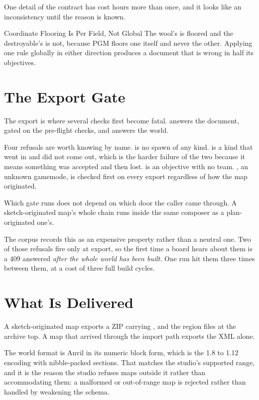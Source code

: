 One detail of the contract has cost hours more than once, and it looks like an
inconsistency until the reason is known.

\begin{ruling}{Coordinate Flooring Is Per Field, Not Global}
The wool's  is floored and the destroyable's  is not,
because PGM floors one itself and never the other. Applying one rule globally in
either direction produces a document that is wrong in half its objectives.
\end{ruling}

\section{The Export Gate}

The export is where several checks first become fatal.  answers the document, gated on the pre-flight checks, and
 answers the world.

Four refusals are worth knowing by name.  is no spawn of any kind.
 is a kind that went in and did not come out, which is the harder failure
of the two because it means something was accepted and then lost.  is an
objective with no team. , an unknown gamemode, is checked first on every
export regardless of how the map originated.

Which gate runs does not depend on which door the caller came through. A
sketch-originated map's whole chain runs inside the same composer as a
plan-originated one's.

The corpus records this as an expensive property rather than a neutral one. Two of
those refusals fire only at export, so the first time a board hears about them is a
409 answered \emph{after the whole world has been built}. One run hit them three
times between them, at a cost of three full build cycles.

\section{What Is Delivered}

A sketch-originated map exports a ZIP carrying ,  and the
region files at the archive top. A map that arrived through the import path exports
the XML alone.

The world format is Anvil in its numeric block form, which is the 1.8 to 1.12
encoding with nibble-packed sections. That matches the studio's supported range,
and it is the reason the studio refuses maps outside it rather than accommodating
them: a malformed or out-of-range map is rejected rather than handled by weakening
the schema.
